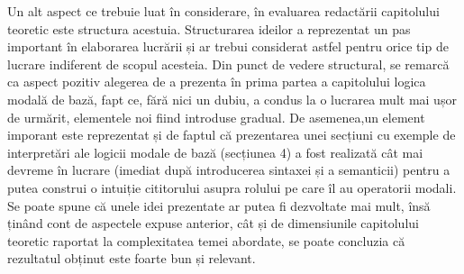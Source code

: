 \documentclass[12pt, openany]{book}
\begin{document}
            \par{}
                Un alt aspect ce trebuie luat în considerare, în evaluarea redactării capitolului teoretic este 
                structura acestuia. Structurarea ideilor a reprezentat un pas important în elaborarea lucrării și ar 
                trebui considerat astfel pentru orice tip de lucrare indiferent de scopul acesteia. Din punct de vedere 
                structural, se remarcă ca aspect pozitiv alegerea de a prezenta în prima partea a capitolului logica 
                modală de bază, fapt ce, fără nici un dubiu, a condus la o lucrarea mult mai ușor de urmărit, elementele 
                noi fiind introduse gradual. De asemenea,un element imporant este reprezentat și de faptul că 
                prezentarea unei secțiuni cu exemple de interpretări ale logicii modale de bază (secțiunea 4) a fost 
                realizată cât mai devreme în lucrare (imediat după introducerea sintaxei și a semanticii) pentru a putea 
                construi o intuiție cititorului asupra rolului pe care îl au operatorii modali. Se poate spune că unele 
                idei prezentate ar putea fi dezvoltate mai mult, însă ținând cont de aspectele expuse anterior, cât și 
                de dimensiunile capitolului teoretic raportat la complexitatea temei abordate, se poate concluzia că 
                rezultatul obținut este foarte bun și relevant.
            
\end{document}
